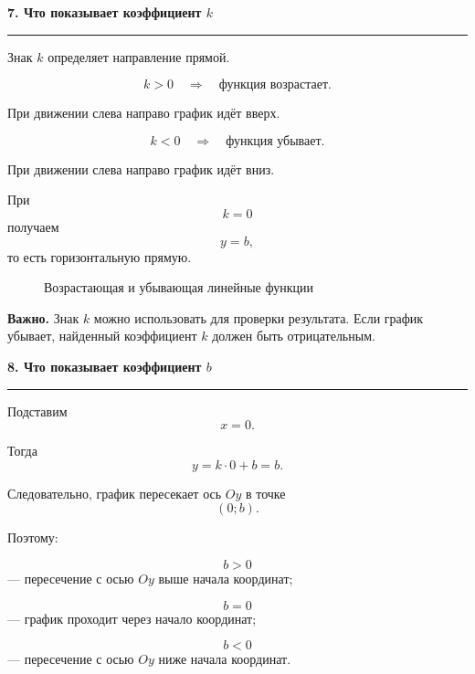 \documentclass[a4paper,12pt]{article}
\newcommand{\topic}[1]{%
  \vspace{0.4em}
  {\Large\bfseries\color{darkaccent}#1\par}
  \vspace{0.25em}
  {\color{accent}\rule{\linewidth}{0.7pt}}
  \vspace{0.45em}
}
\newcommand{\important}[1]{%
  \par\vspace{0.3em}
  {\color{darkaccent}\bfseries Важно.} #1
  \par\vspace{0.3em}
}
\begin{document}
\topic{7. Что показывает коэффициент \(k\)}

Знак \(k\) определяет направление прямой.

\[
k>0
\quad\Longrightarrow\quad
\text{функция возрастает}.
\]

При движении слева направо график идёт вверх.

\[
k<0
\quad\Longrightarrow\quad
\text{функция убывает}.
\]

При движении слева направо график идёт вниз.

При
\[
k=0
\]
получаем
\[
y=b,
\]
то есть горизонтальную прямую.

\begin{figure}[ht]
\centering
{}
\caption{Возрастающая и убывающая линейные функции}
\end{figure}

\important{Знак \(k\) можно использовать для проверки результата. Если график убывает, найденный коэффициент \(k\) должен быть отрицательным.}

\topic{8. Что показывает коэффициент \(b\)}

Подставим
\[
x=0.
\]

Тогда
\[
y=k\cdot0+b=b.
\]

Следовательно, график пересекает ось \(Oy\) в точке
\[
\boxed{(0;b)}.
\]

Поэтому:

\[
b>0
\]
--- пересечение с осью \(Oy\) выше начала координат;

\[
b=0
\]
--- график проходит через начало координат;

\[
b<0
\]
--- пересечение с осью \(Oy\) ниже начала координат.
\end{document}
